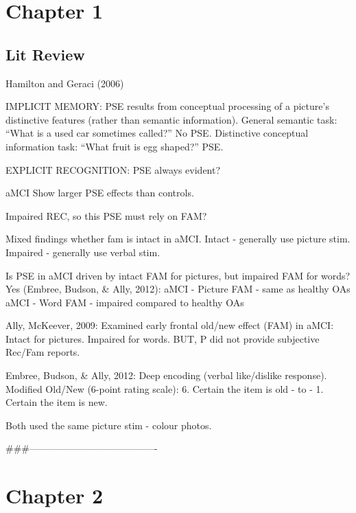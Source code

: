 \documentclass[
  11pt,
]{article}
\author{}
\date{\vspace{-2.5em}}
\begin{document}
{
\setcounter{tocdepth}{4}
\tableofcontents
}
\newpage

\hypertarget{chapter-1}{%
\section{Chapter 1}\label{chapter-1}}

\hypertarget{lit-review}{%
\subsection{Lit Review}\label{lit-review}}

Hamilton and Geraci (2006)

IMPLICIT MEMORY: PSE results from conceptual processing of a picture's
distinctive features (rather than semantic information). General
semantic task: ``What is a used car sometimes called?'' No PSE.
Distinctive conceptual information task: ``What fruit is egg shaped?''
PSE.

EXPLICIT RECOGNITION: PSE always evident?

aMCI Show larger PSE effects than controls.

Impaired REC, so this PSE must rely on FAM?

Mixed findings whether fam is intact in aMCI. Intact - generally use
picture stim. Impaired - generally use verbal stim.

Is PSE in aMCI driven by intact FAM for pictures, but impaired FAM for
words? Yes (Embree, Budson, \& Ally, 2012): aMCI - Picture FAM - same as
healthy OAs aMCI - Word FAM - impaired compared to healthy OAs

Ally, McKeever, 2009: Examined early frontal old/new effect (FAM) in
aMCI: Intact for pictures. Impaired for words. BUT, P did not provide
subjective Rec/Fam reports.

Embree, Budson, \& Ally, 2012: Deep encoding (verbal like/dislike
response). Modified Old/New (6-point rating scale): 6. Certain the item
is old - to - 1. Certain the item is new.

Both used the same picture stim - colour photos.

\#\#\#----------------------------------------

\newpage

\hypertarget{chapter-2}{%
\section{Chapter 2}\label{chapter-2}}
\end{document}
